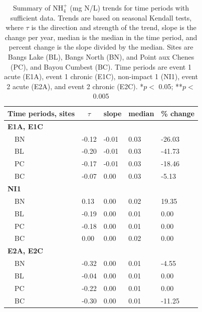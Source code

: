 \documentclass[letterpaper,12pt]{article}\usepackage[]{graphicx}\usepackage[]{color}
\begin{document}
\begin{table}[!tbp]
\caption{Summary of NH$_4^+$ (mg N/L) trends for time periods with sufficient data.  Trends are based on seasonal Kendall tests, where $\tau$ is the direction and strength of the trend, slope is the change per year, median is the median in the time period, and percent change is the slope divided by the median. Sites are Bangs Lake (BL), Bangs North (BN), and Point aux Chenes (PC), and Bayou Cumbest (BC). Time periods are event 1 acute (E1A), event 1 chronic (E1C), non-impact 1 (NI1), event 2 acute (E2A), and event 2 chronic (E2C). *$p <$ 0.05; **$p <$ 0.005\label{tab:NH4Ftrnd}} 
\begin{center}
\begin{tabular}{lllll}
\hline\hline
\multicolumn{1}{l}{Time periods, sites}&\multicolumn{1}{c}{$\tau$}&\multicolumn{1}{c}{slope}&\multicolumn{1}{c}{median}&\multicolumn{1}{c}{\% change}\tabularnewline
\hline
{\bfseries E1A, E1C}&&&&\tabularnewline
~~BN&-0.12&-0.01&0.03&-26.03\tabularnewline
~~BL&-0.20&-0.01&0.03&-41.73\tabularnewline
~~PC&-0.17&-0.01&0.03&-18.46\tabularnewline
~~BC&-0.07&0.00&0.03&-5.13\tabularnewline
\hline
{\bfseries NI1}&&&&\tabularnewline
~~BN&0.13&0.00&0.02&19.35\tabularnewline
~~BL&-0.19&0.00&0.01&0.00\tabularnewline
~~PC&-0.18&0.00&0.01&0.00\tabularnewline
~~BC&0.00&0.00&0.02&0.00\tabularnewline
\hline
{\bfseries E2A, E2C}&&&&\tabularnewline
~~BN&-0.32&0.00&0.01&-4.55\tabularnewline
~~BL&-0.04&0.00&0.01&0.00\tabularnewline
~~PC&-0.22&0.00&0.01&0.00\tabularnewline
~~BC&-0.30&0.00&0.01&-11.25\tabularnewline
\hline
\end{tabular}\end{center}
\end{table}
\end{document}
